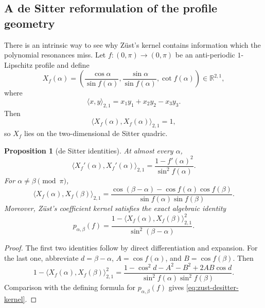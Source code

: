 \documentclass[11pt]{article}
\newtheorem{proposition}[theorem]{Proposition}
\newcommand{\R}{\mathbb R}
\begin{document}
\subsection{A de Sitter reformulation of the profile geometry}

There is an intrinsic way to see why Z\"ust's kernel contains information which the
polynomial resonances miss.  Let $f:(0,\pi)\to(0,\pi)$ be an anti-periodic
$1$-Lipschitz profile and define
\begin{equation}\label{eq:desitter-map}
 X_f(\alpha)
 =\left(
 \frac{\cos\alpha}{\sin f(\alpha)},
 \frac{\sin\alpha}{\sin f(\alpha)},
 \cot f(\alpha)
 \right)\in\R^{2,1},
\end{equation}
where
\[
        \langle x,y\rangle_{2,1}=x_1y_1+x_2y_2-x_3y_3.
\]
Then
\[
        \langle X_f(\alpha),X_f(\alpha)\rangle_{2,1}=1,
\]
so $X_f$ lies on the two-dimensional de Sitter quadric.

\begin{proposition}[de Sitter identities]\label{prop:desitter-identities}
At almost every $\alpha$,
\begin{equation}\label{eq:desitter-speed}
 \boxed{
 \langle X_f'(\alpha),X_f'(\alpha)\rangle_{2,1}
 =\frac{1-f'(\alpha)^2}{\sin^2f(\alpha)}.}
\end{equation}
For $\alpha\ne\beta\pmod\pi$,
\begin{equation}\label{eq:desitter-inner}
 \langle X_f(\alpha),X_f(\beta)\rangle_{2,1}
 =
 \frac{
 \cos(\beta-\alpha)-\cos f(\alpha)\cos f(\beta)
 }{
 \sin f(\alpha)\sin f(\beta)
 }.
\end{equation}
Moreover, Z\"ust's coefficient kernel satisfies the exact algebraic identity
\begin{equation}\label{eq:zust-desitter-kernel}
 \boxed{
 p_{\alpha,\beta}(f)
 =
 \frac{
 1-\langle X_f(\alpha),X_f(\beta)\rangle_{2,1}^2
 }{
 \sin^2(\beta-\alpha)
 }.}
\end{equation}
\end{proposition}

\begin{proof}
The first two identities follow by direct differentiation and expansion.
For the last one, abbreviate
$d=\beta-\alpha$, $A=\cos f(\alpha)$, and
$B=\cos f(\beta)$.  Then
\[
 1-\langle X_f(\alpha),X_f(\beta)\rangle_{2,1}^2
 =
 \frac{
 1-\cos^2d-A^2-B^2+2AB\cos d
 }{
 \sin^2f(\alpha)\sin^2f(\beta)
 }.
\]
Comparison with the defining formula for $p_{\alpha,\beta}(f)$ gives
\eqref{eq:zust-desitter-kernel}.
\end{proof}
\end{document}
